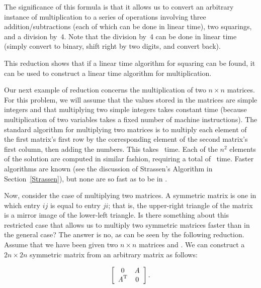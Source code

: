 \noindent The significance of this formula is that it allows us to
convert an arbitrary instance of multiplication to a series of
operations involving three addition/subtractions (each of which can be
done in linear time), two squarings, and a division by~4.
Note that the division by~4 can be done in linear time (simply convert
to binary, shift right by two digits, and convert back).

This reduction shows that if a linear time algorithm for squaring can
be found, it can be used to construct a linear time algorithm for
multiplication.

Our next example of reduction concerns the multiplication of two
\(n \times n\) matrices.
For this problem, we will assume that the values stored in the
matrices are simple integers and that multiplying two simple integers
takes constant time (because multiplication of two 
variables takes a fixed number of machine instructions).
The standard algorithm for multiplying two matrices is to multiply
each element of the first matrix's first row by the corresponding
element of the second matrix's first column, then adding the numbers.
This takes \Thetan\ time.
Each of the \(n^2\) elements of the solution are computed in similar
fashion, requiring a total of \Thetanthree\ time.
Faster algorithms are known (see the discussion of Strassen's
Algorithm in Section~\ref{Strassen}),
but none are so fast as to be in \Ontwo.

Now, consider the case of multiplying two  matrices.
A symmetric matrix is one in which entry \(ij\) is equal to entry \(ji\);
that is, the upper-right triangle of the matrix is a mirror image of
the lower-left triangle.
Is there something about this restricted case that allows us to
multiply two symmetric matrices faster than in the general case?
The answer is no, as can be seen by the following reduction.
Assume that we have been given two \(n \times n\) matrices  and
.
We can construct a \(2n \times 2n\) symmetric matrix from an arbitrary
matrix  as follows:

\[
\left[
\begin{array}{cc}
0 &{\textit{A}}\\
{\textit{A}}^{\rm T}& 0
\end{array}
\right].
\]

